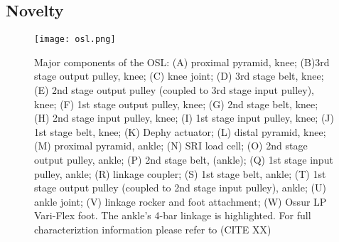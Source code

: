 \documentclass[10pt,twocolumn,letterpaper]{article}
\begin{document}
\subsection{Novelty}







\begin{figure}
	\begin{center}
		\texttt{[image: osl.png]}
	\end{center}
	\caption{Major components of the OSL: (A) proximal pyramid, knee; (B)3rd stage output pulley, knee; (C) knee joint; (D) 3rd stage belt, knee; (E) 2nd stage output pulley (coupled to 3rd stage input pulley), knee; (F) 1st stage output pulley, knee; (G) 2nd stage belt, knee; (H) 2nd stage input pulley, knee; (I) 1st stage input pulley, knee; (J) 1st stage belt, knee; (K) Dephy actuator; (L) distal pyramid, knee; (M) proximal pyramid, ankle; (N) SRI load cell; (O) 2nd stage output pulley, ankle; (P) 2nd stage belt, (ankle); (Q) 1st stage input pulley, ankle; (R) linkage coupler; (S) 1st stage belt, ankle; (T) 1st stage output pulley (coupled to 2nd stage input pulley), ankle; (U) ankle joint; (V) linkage rocker and foot attachment; (W) Ossur LP Vari-Flex foot. The ankle's 4-bar linkage is highlighted. For full characteriztion information please refer to (CITE XX) }
	\label{fig:long}
	\label{fig:onecol}
\end{figure}


{\small


}
\end{document}
